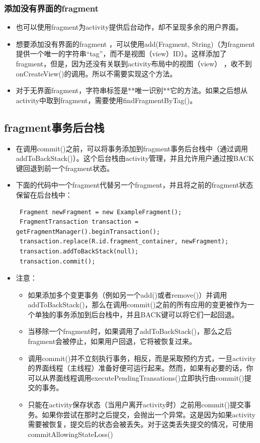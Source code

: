\documentclass[9pt, b5paper]{article}
\begin{document}
\subsubsection{添加没有界面的fragment}
\label{sec-2-3-3}
\begin{itemize}
\item 也可以使用fragment为activity提供后台动作，却不呈现多余的用户界面。
\item 想要添加没有界面的fragment ，可以使用add(Fragment, String)（为fragment提供一个唯一的字符串“tag”，而不是视图（view）ID）。这样添加了fragment，但是，因为还没有关联到activity布局中的视图（view） ，收不到onCreateView()的调用。所以不需要实现这个方法。　
\item 对于无界面fragment，字符串标签是**唯一识别**它的方法。如果之后想从activity中取到fragment，需要使用findFragmentByTag()。　
\end{itemize}
\subsection{fragment事务后台栈}
\label{sec-2-4}
\begin{itemize}
\item 在调用commit()之前，可以将事务添加到fragment事务后台栈中（通过调用addToBackStack()）。这个后台栈由activity管理，并且允许用户通过按BACK键回退到前一个fragment状态。
\item 下面的代码中一个fragment代替另一个fragment，并且将之前的fragment状态保留在后台栈中：
\begin{verbatim}
 Fragment newFragment = new ExampleFragment();
 FragmentTransaction transaction = getFragmentManager().beginTransaction();
 transaction.replace(R.id.fragment_container, newFragment);
 transaction.addToBackStack(null);
 transaction.commit();
\end{verbatim}
\item 注意：
\begin{itemize}
\item 如果添加多个变更事务（例如另一个add()或者remove()）并调用addToBackStack()，那么在调用commit()之前的所有应用的变更被作为一个单独的事务添加到后台栈中，并且BACK键可以将它们一起回退。
\item 当移除一个fragment时，如果调用了addToBackStack()，那么之后fragment会被停止，如果用户回退，它将被恢复过来。
\item 调用commit()并不立刻执行事务，相反，而是采取预约方式，一旦activity的界面线程（主线程）准备好便可运行起来。然而，如果有必要的话，你可以从界面线程调用executePendingTransations()立即执行由commit()提交的事务。
\item 只能在activity保存状态（当用户离开activity时）之前用commit()提交事务。如果你尝试在那时之后提交，会抛出一个异常。这是因为如果activity需要被恢复，提交后的状态会被丢失。对于这类丢失提交的情况，可使用commitAllowingStateLoss()
\end{itemize}
\end{itemize}
\end{document}
